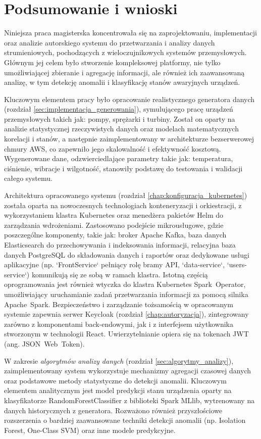 \section{Podsumowanie i wnioski}
\label{sec:podsumowanie_wnioski}

Niniejsza praca magisterska koncentrowała się na zaprojektowaniu, implementacji oraz analizie autorskiego systemu do przetwarzania i analizy danych strumieniowych, pochodzących z wieloczujnikowych systemów przemysłowych. Głównym jej celem było stworzenie kompleksowej platformy, nie tylko umożliwiającej zbieranie i agregację informacji, ale również ich zaawansowaną analizę, w tym detekcję anomalii i klasyfikację stanów awaryjnych urządzeń.

Kluczowym elementem pracy było opracowanie realistycznego generatora danych (rozdział \ref{sec:implementacja_generowania}), symulującego pracę urządzeń przemysłowych takich jak: pompy, sprężarki i turbiny. Został on oparty na analizie statystycznej rzeczywistych danych oraz modelach matematycznych korelacji i stanów, a następnie zaimplementowany w architekturze bezserwerowej chmury AWS, co zapewniło jego skalowalność i efektywność kosztową. Wygenerowane dane, odzwierciedlające parametry takie jak: temperatura, ciśnienie, wibracje i wilgotność, stanowiły podstawę do testowania i walidacji całego systemu.

Architektura opracowanego systemu (rozdział \ref{chap:konfiguracja_kubernetes}) została oparta na nowoczesnych technologiach konteneryzacji i orkiestracji, z wykorzystaniem klastra Kubernetes oraz menedżera pakietów Helm do zarządzania wdrożeniami. Zastosowano podejście mikrousługowe, gdzie poszczególne komponenty, takie jak: broker Apache Kafka, baza danych Elasticsearch do przechowywania i indeksowania informacji, relacyjna baza danych PostgreSQL do składowania danych i raportów oraz dedykowane usługi aplikacyjne (np. `FrontService` pełniący rolę bramy API, `data-service`, `users-service`) komunikują się ze sobą w ramach klastra. Istotną częścią oprogramowania jest również wtyczka do klastra Kubernetes \mbox{Spark Operator}, umożliwiający uruchamianie zadań przetwarzania informacji za pomocą silnika \mbox{Apache Spark}. Bezpieczeństwo i zarządzanie tożsamością w opracowanym systemie zapewnia serwer Keycloak (rozdział \ref{chap:autoryzacja}), zintegrowany zarówno z komponentami back-endowymi, jak i z interfejsem użytkownika stworzonym w technologii React. Uwierzytelnianie opiera się na tokenach JWT (ang. \mbox{JSON Web Token}).

W zakresie \textit{algorytmów analizy danych} (rozdział \ref{sec:algorytmy_analizy}), zaimplementowany system wykorzystuje mechanizmy agregacji czasowej danych oraz podstawowe metody statystyczne do detekcji anomalii. Kluczowym elementem analitycznym jest model predykcji stanu urządzenia oparty na klasyfikatorze \mbox{RandomForestClassifier} z biblioteki Spark MLlib, wytrenowany na danych historycznych z generatora. Rozważono również przyszłościowe rozszerzenia o bardziej zaawansowane techniki detekcji anomalii (np. Isolation Forest, One-Class SVM) oraz inne modele predykcyjne.

